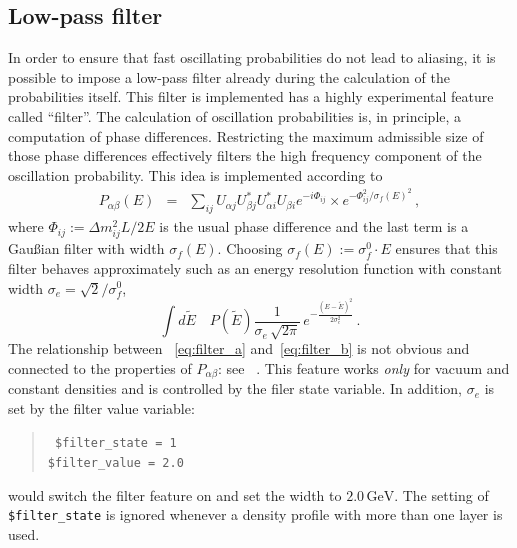 \subsection{Low-pass filter}

In order to ensure that fast oscillating probabilities do not lead to 
aliasing,
it is possible to impose a low-pass filter already during the calculation
of the probabilities itself. This filter is implemented has a highly
experimental feature called ``filter''. 
The calculation of oscillation
probabilities is, in principle, a computation of phase differences. Restricting the maximum admissible size of those phase differences effectively filters
the high frequency component of the oscillation probability. This idea is
implemented according to
\begin{eqnarray}
\label{eq:filter_a}
P_{\alpha\beta}(E)&=&\sum_{ij}
U_{\alpha j} U^*_{\beta j} U^*_{\alpha i} U_{\beta i} 
e^{-i\Phi_{ij}}\times 
e^{ -\Phi_{ij}^2/\sigma_f(E)^2 }\,,
\end{eqnarray}
where $\Phi_{ij}:=\Delta m_{ij}^2 L/2E$ is the usual phase difference and
the last term is a Gau\ss ian filter with width $\sigma_f(E)$. Choosing
$\sigma_f(E):=\sigma_f^0 \cdot E$ ensures that this filter behaves 
approximately such as an energy resolution function with constant width 
$\sigma_e=\sqrt{2}/\sigma_f^0$, \ie\
\begin{equation}
\label{eq:filter_b}
\int d\tilde E\quad P(\tilde E) \frac{1}{\sigma_e\,\sqrt{2\pi}}\,
e^{-\frac{(E-\tilde E)^2}{2\sigma^2_e}}\,.
\end{equation}
The relationship between \eqs~\ref{eq:filter_a} and~\ref{eq:filter_b}
is not obvious and connected to the properties of $P_{\alpha\beta}$: 
see \Refs~\cite{Kiers:1996zj,Giunti:2003ax}. This feature works \emph{only} 
for vacuum and constant densities and is controlled
by the filer state variable. In addition, $\sigma_e$ is set by the filter value variable:
\index{aedl}{filter state@{\tt \$filter\_state}}
\begin{quote}
{\tt
\$filter\_state = 1\\
\$filter\_value = 2.0\\
}
\end{quote}
would switch the filter feature on and set the width to $2.0\,\mathrm{GeV}$.
The setting of {\tt \$filter\_state} is ignored whenever a density profile
with more than one layer is used. 

